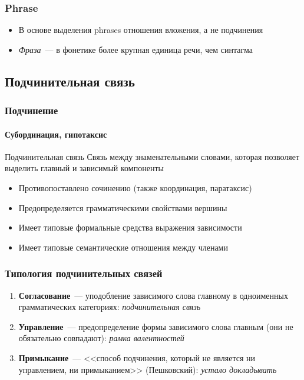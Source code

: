 \begin{frame}
  \frametitle{Phrase}

  \begin{itemize}
    \item В основе выделения phrases отношения вложения, а не подчинения
    \item \textit{Фраза}~--- в фонетике более крупная единица речи, чем синтагма
  \end{itemize}
\end{frame}

\subsection{Подчинительная связь}

\begin{frame}
  \frametitle{Подчинение}
  \framesubtitle{Субординация, гипотаксис}

  \begin{alertblock}{Подчинительная связь}
    Связь между знаменательными словами, которая позволяет выделить главный и зависимый компоненты
  \end{alertblock}

  \vfill

  \begin{itemize}
    \item Противопоставлено сочинению (также координация, паратаксис)
    \item Предопределяется грамматическими свойствами вершины
    \item Имеет типовые формальные средства выражения зависимости
    \item Имеет типовые семантические отношения между членами
  \end{itemize}
\end{frame}

\begin{frame}
  \frametitle{Типология подчинительных связей}

  \begin{enumerate}
    \item \textbf{Согласование}~--- уподобление зависимого слова главному в одноименных грамматических категориях: \textit{подчинительная связь}
    \item \textbf{Управление}~--- предопределение формы зависимого слова главным (они не обязательно совпадают): \textit{рамка валентностей}
    \item \textbf{Примыкание}~--- <<способ подчинения, который не является ни управлением, ни примыканием>> (Пешковский): \textit{устало докладывать}
  \end{enumerate}
\end{frame}

